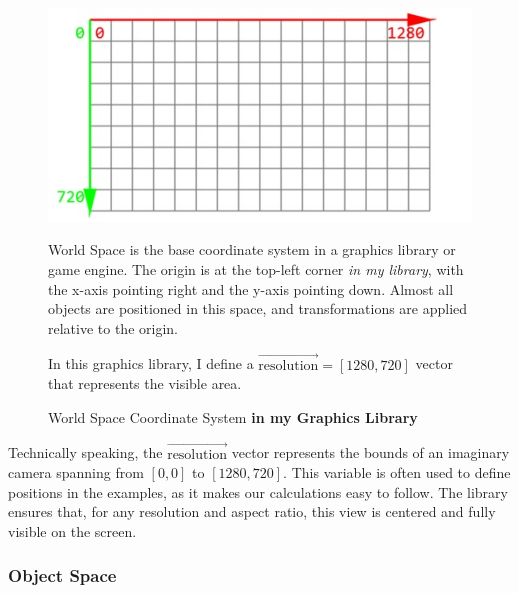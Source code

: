 \begin{figure}[h]
    \centering
    \begin{minipage}[b]{0.4\textwidth}
        \includegraphics[width=\linewidth]{img/world-space.jpg}
        \caption{World Space Coordinate System \textbf{in my Graphics Library}}
    \end{minipage}\hfill
    \begin{minipage}[b]{0.55\textwidth}
        \setlength{\parskip}{1em}
        \setlength{\parindent}{0pt}
        World Space is the base coordinate system in a graphics library or game engine. The origin is at the top-left corner \textit{in my library}, with the x-axis pointing right and the y-axis pointing down. Almost all objects are positioned in this space, and transformations are applied relative to the origin.

        In this graphics library, I define a \(\vec{\text{resolution}}=[1280, 720]\) vector that represents the visible area.
    \end{minipage}
\end{figure}

\begin{Note}
    Technically speaking, the \(\vec{\text{resolution}}\) vector represents the bounds of an imaginary camera spanning from \([0, 0]\) to \([1280, 720]\). This variable is often used to define positions in the examples, as it makes our calculations easy to follow. The library ensures that, for any resolution and aspect ratio, this view is centered and fully visible on the screen.
\end{Note}

\pagebreak

\subsubsection{Object Space}
\label{sec:object-space}

